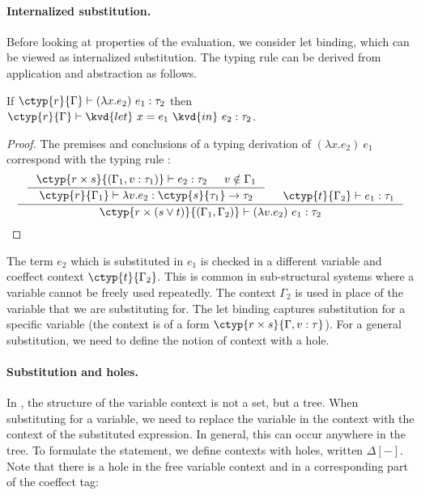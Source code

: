 \paragraph{Internalized substitution.}
Before looking at properties of the evaluation, we consider let binding, which can be 
viewed as internalized substitution. The typing rule  can be derived from 
application and abstraction as follows. 

\begin{lemma}
If $\ctyp{r}{\Gamma} \vdash (\lambda x.e_2)~e_1 : \tau_2$
then $\ctyp{r}{\Gamma} \vdash \kvd{let}~x=e_1~\kvd{in}~e_2 : \tau_2$.
\end{lemma}
\begin{proof}
The premises and conclusions of a typing derivation of $(\lambda x.e_2)~e_1$
correspond with the typing rule :
\begin{equation*}
\inference[]
  {\inference
    {\ctyp{r \csprd s}{(\Gamma_1, v:\tau_1)} \vdash e_2 : \tau_2 & v \notin \Gamma_1}
    {\ctyp{r}{\Gamma_1} \vdash \lambda v.e_2 : \ctyp{s}{\tau_1} \rightarrow \tau_2 } &
   \ctyp{t}{\Gamma_2} \vdash e_1 : \tau_1 }
  {\ctyp{r \csprd (s \csvop t)}{(\Gamma_1, \Gamma_2)} \vdash (\lambda v.e_2)~e_1 : \tau_2}\qedhere
\end{equation*}
\end{proof}

The term $e_2$ which is substituted in $e_1$ is checked in a different variable
and coeffect context $\ctyp{t}{\Gamma_2}$. This is common in sub-structural systems where
a variable cannot be freely used repeatedly. The context $\Gamma_2$ is used in place of 
the variable that we are substituting for. The let binding captures substitution for a 
specific variable (the context is of a form $\ctyp{r \csprd s}{\Gamma, v:\tau}$).
For a general substitution, we need to define the notion of context with a hole.

\newcommand{\chole}[4]{\ctyp{#1}{#2}[#3|#4]}
\paragraph{Substitution and holes.}
In \clstr, the structure of the variable context is not a set, but a tree. When substituting
for a variable, we need to replace the variable in the context with the context of the
substituted expression. In general, this can occur anywhere in the tree. To formulate the
statement, we define contexts with holes, written $\Delta[-]$. Note that there is a hole
in the free variable context and in a corresponding part of the coeffect tag:

